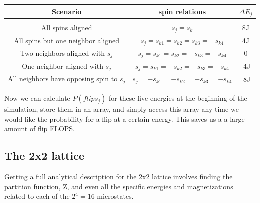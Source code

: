 \documentclass[a4paper, 12pt]{article}
\begin{document}
{		\begin{center}
		\begin{tabular}{ c c c }
			Scenario & spin relations & $\Delta E_j$ \\\hline\\
			All spins aligned & $s_j = s_k$ & 8J\\
			All spins but one neighbor aligned & $s_j = s_{k1} = s_{k2} = s_{k3} = -s_{k4}$  & 4J\\
			Two neighbors aligned with $s_j$ & $s_j = s_{k1} = s_{k2} = -s_{k3} = -s_{k4}$  & 0\\
			One neighbor aligned with $s_j $& $s_j = s_{k1} = -s_{k2} = -s_{k3} = -s_{k4}$  & -4J\\
			All neighbors have opposing spin to $s_j$ & $s_j = -s_{k1} = -s_{k2} = -s_{k3} = -s_{k4}$  & -8J\\
		\end{tabular}
		\end{center}
		Now we can calculate $P(flip s_j)$ for these five energies at the beginning of the simulation, store them in an array, and simply access this array any time we would like the probability for a flip at a certain energy. This saves us a a large amount of flip FLOPS.

\subsection{The 2x2 lattice}
	Getting a full analytical description for the 2x2 lattice involves finding the partition function, Z, and even all the specific energies and magnetizations related to each of the $2^4=16$ microstates.
}
\end{document}
